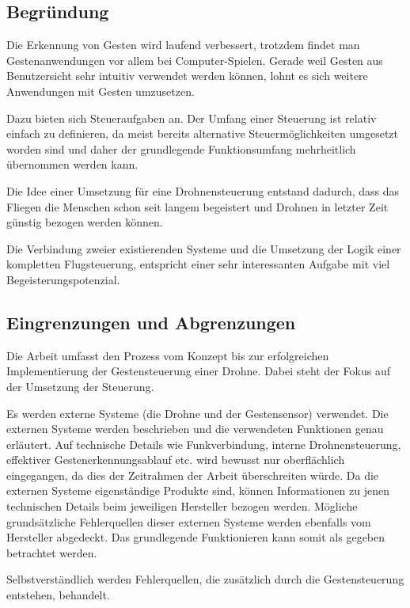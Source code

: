 \subsection{Begründung}
Die Erkennung von Gesten wird laufend verbessert, trotzdem findet man Gestenanwendungen vor allem bei Computer-Spielen.
Gerade weil Gesten aus Benutzersicht sehr intuitiv verwendet werden können, lohnt es sich weitere Anwendungen mit Gesten umzusetzen.

Dazu bieten sich Steueraufgaben an.
Der Umfang einer Steuerung ist relativ einfach zu definieren, da meist bereits alternative Steuermöglichkeiten umgesetzt worden sind und daher der grundlegende Funktionsumfang mehrheitlich übernommen werden kann.

Die Idee einer Umsetzung für eine Drohnensteuerung entstand dadurch, dass das Fliegen die Menschen schon seit langem begeistert und Drohnen in letzter Zeit günstig bezogen werden können.

Die Verbindung zweier existierenden Systeme und die Umsetzung der Logik einer kompletten Flugsteuerung, entspricht einer sehr interessanten Aufgabe mit viel Begeisterungspotenzial.

\subsection{Eingrenzungen und Abgrenzungen}
Die Arbeit umfasst den Prozess vom Konzept bis zur erfolgreichen Implementierung der Gestensteuerung einer Drohne.
Dabei steht der Fokus auf der Umsetzung der Steuerung.

Es werden externe Systeme (die Drohne und der Gestensensor) verwendet.
Die externen Systeme werden beschrieben und die verwendeten Funktionen genau erläutert.
Auf technische Details wie Funkverbindung, interne Drohnensteuerung, effektiver Gestenerkennungsablauf etc. wird bewusst nur oberflächlich eingegangen, da dies der Zeitrahmen der Arbeit überschreiten würde.
Da die externen Systeme eigenständige Produkte sind, können Informationen zu jenen technischen Details beim jeweiligen Hersteller bezogen werden.
Mögliche grundsätzliche Fehlerquellen dieser externen Systeme werden ebenfalls vom Hersteller abgedeckt.
Das grundlegende Funktionieren kann somit als gegeben betrachtet werden.

Selbstverständlich werden Fehlerquellen, die zusätzlich durch die Gestensteuerung entstehen, behandelt.
